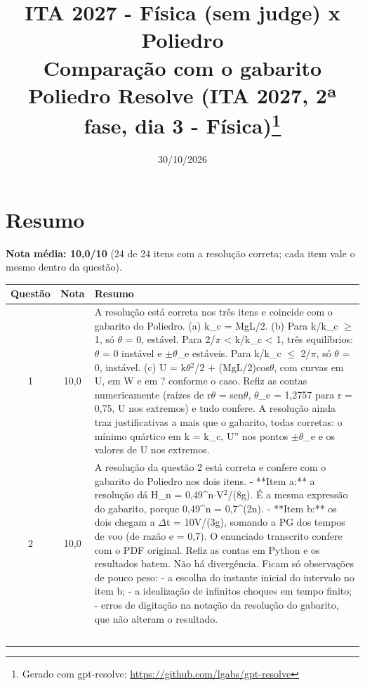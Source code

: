 \documentclass{article}%
\title{ITA 2027 {-} Física (sem judge) x Poliedro\\[4pt]\large Comparação com o gabarito Poliedro Resolve (ITA 2027, 2ª fase, dia 3 {-} Física)\thanks{Gerado com gpt-resolve: \url{https://github.com/lgabs/gpt-resolve}}}%
\date{30/10/2026}%
\begin{document}
%
\normalsize%
\maketitle%
\section*{Resumo}\textbf{Nota média: 10,0/10} (24 de 24 itens com a resolução correta; cada item vale o mesmo dentro da questão).\par\medskip%
\begin{longtable}{@{}c c p{}@{}}\toprule Questão & Nota & Resumo \\ \midrule
1 & 10,0 & A resolução está correta nos três itens e coincide com o gabarito do Poliedro. (a) k\_c = MgL/2. (b) Para k/k\_c $\geq$ 1, só $\theta$ = 0, estável. Para 2/$\pi$ < k/k\_c < 1, três equilíbrios: $\theta$ = 0 instável e $\pm$$\theta$\_e estáveis. Para k/k\_c $\leq$ 2/$\pi$, só $\theta$ = 0, instável. (c) U = k$\theta$$^2$/2 + (MgL/2)cos$\theta$, com curvas em U, em W e em ? conforme o caso. Refiz as contas numericamente (raízes de r$\theta$ = sen$\theta$, $\theta$\_e = 1,2757 para r = 0,75, U nos extremos) e tudo confere. A resolução ainda traz justificativas a mais que o gabarito, todas corretas: o mínimo quártico em k = k\_c, U'' nos pontos $\pm$$\theta$\_e e os valores de U nos extremos. \\
2 & 10,0 & A resolução da questão 2 está correta e confere com o gabarito do Poliedro nos dois itens.\newline%
\newline%
{-} **Item a:** a resolução dá H\_n = 0,49\^{}n$\cdot$V$^2$/(8g). É a mesma expressão do gabarito, porque 0,49\^{}n = 0,7\^{}(2n).\newline%
{-} **Item b:** os dois chegam a $\Delta$t = 10V/(3g), somando a PG dos tempos de voo (de razão e = 0,7).\newline%
\newline%
O enunciado transcrito confere com o PDF original. Refiz as contas em Python e os resultados batem. Não há divergência. Ficam só observações de pouco peso:\newline%
{-} a escolha do instante inicial do intervalo no item b;\newline%
{-} a idealização de infinitos choques em tempo finito;\newline%
{-} erros de digitação na notação da resolução do gabarito, que não alteram o resultado. \\
$$
\end{longtable}
\end{document}
